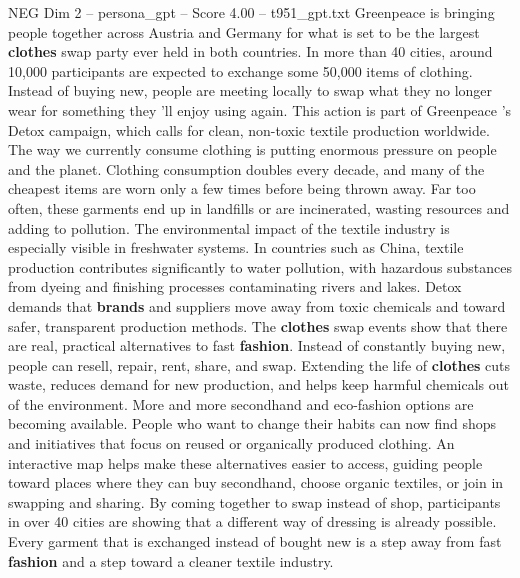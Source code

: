 \begin{textsample}{NEG Dim 2 – persona\_gpt – Score 4.00 – t951\_gpt.txt}  \label{ex:f2_neg_048}
Greenpeace is bringing people together across Austria and Germany for what is set to be the largest \textbf{clothes} swap party ever held in both countries.
In more than 40 cities, around 10,000 participants are expected to exchange some 50,000 items of clothing.
Instead of buying new, people are meeting locally to swap what they no longer wear for something they ’ll enjoy using again.
This action is part of Greenpeace ’s Detox campaign, which calls for clean, non-toxic textile production worldwide.
The way we currently consume clothing is putting enormous pressure on people and the planet.
Clothing consumption doubles every decade, and many of the cheapest items are worn only a few times before being thrown away.
Far too often, these garments end up in landfills or are incinerated, wasting resources and adding to pollution.
The environmental impact of the textile industry is especially visible in freshwater systems.
In countries such as China, textile production contributes significantly to water pollution, with hazardous substances from dyeing and finishing processes contaminating rivers and lakes.
Detox demands that \textbf{brands} and suppliers move away from toxic chemicals and toward safer, transparent production methods.
The \textbf{clothes} swap events show that there are real, practical alternatives to fast \textbf{fashion}.
Instead of constantly buying new, people can resell, repair, rent, share, and swap.
Extending the life of \textbf{clothes} cuts waste, reduces demand for new production, and helps keep harmful chemicals out of the environment.
More and more secondhand and eco-fashion options are becoming available.
People who want to change their habits can now find shops and initiatives that focus on reused or organically produced clothing.
An interactive map helps make these alternatives easier to access, guiding people toward places where they can buy secondhand, choose organic textiles, or join in swapping and sharing.
By coming together to swap instead of shop, participants in over 40 cities are showing that a different way of dressing is already possible.
Every garment that is exchanged instead of bought new is a step away from fast \textbf{fashion} and a step toward a cleaner textile industry.

\end{textsample}
